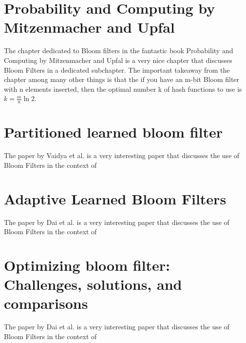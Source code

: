\documentclass[MScCS]{uccthesis}
\begin{document}
\section{Probability and Computing by Mitzenmacher and Upfal}
The chapter dedicated to Bloom filters in the fantastic book Probability and Computing by Mitzenmacher and Upfal \cite{mitzenmacher2017probability} is a very nice chapter that discusses Bloom Filters in a dedicated subchapter. The important takeaway from the chapter among many other things is that the if you have an m-bit Bloom filter with n elements inserted, then the optimal number k of hash functions to use is $k = \frac{m}{n}\ln 2$.

\section{Partitioned learned bloom filter}
The paper by Vaidya et al. \cite{vaidya2020partitioned} is a very interesting paper that discusses the use of Bloom Filters in the context of

\cite{vaidya2020partitioned}
\section{Adaptive Learned Bloom Filters}
The paper by Dai et al. \cite{dai2019adaptive} is a very interesting paper that discusses the use of Bloom Filters in the context of
\cite{dai2019adaptive}

\section{Optimizing bloom filter: Challenges, solutions, and comparisons}
The paper by Dai et al. \cite{dai2019optimizing} is a very interesting paper that discusses the use of Bloom Filters in the context of
\cite{dai2019optimizing}

%
%
\backmatter
%
%
\printbibliography
\end{document}
